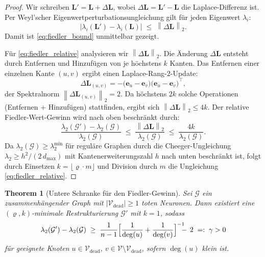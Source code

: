 ﻿\documentclass[12pt, a4paper, openany]{report}
\newtheorem{theorem}{Theorem}[chapter]
\newcommand{\calG}{\mathcal{G}}
\newcommand{\calV}{\mathcal{V}}
\newcommand{\norms}[1]{\left\|#1\right\|}
\newcommand{\abs}[1]{\left|#1\right|}
\begin{document}
\begin{proof}
Wir schreiben $\bm{L}' = \bm{L} + \Delta\bm{L}$, wobei $\Delta\bm{L} =
\bm{L}' - \bm{L}$ die Laplace-Differenz ist.  Per Weyl'scher
Eigenwertperturbationsungleichung gilt für jeden Eigenwert $\lambda_i$:
\begin{equation}
  \label{eq:weyl}
  \abs{\lambda_i(\bm{L}') - \lambda_i(\bm{L})} \;\leq\; \norms{\Delta\bm{L}}_2.
\end{equation}
Damit ist \eqref{eq:fiedler_bound} unmittelbar gezeigt.

Für \eqref{eq:fiedler_relative} analysieren wir $\norms{\Delta\bm{L}}_2$.
Die Änderung $\Delta\bm{L}$ entsteht durch Entfernen und Hinzufügen von
je höchstens $k$ Kanten.  Das Entfernen einer einzelnen Kante
$(u,v)$ ergibt einen Laplace-Rang-$2$-Update:
\[
  \Delta\bm{L}_{(u,v)}
  = -\bigl(\bm{e}_u - \bm{e}_v\bigr)\bigl(\bm{e}_u - \bm{e}_v\bigr)^\top,
\]
der Spektralnorm $\norms{\Delta\bm{L}_{(u,v)}}_2 = 2$.  Da höchstens
$2k$ solche Operationen (Entfernen + Hinzufügen) stattfinden, ergibt
sich $\norms{\Delta\bm{L}}_2 \leq 4k$.  Der relative Fiedler-Wert-Gewinn
wird nach oben beschränkt durch:
\[
  \frac{\lambda_2(\calG') - \lambda_2(\calG)}{\lambda_2(\calG)}
  \;\leq\;
  \frac{\norms{\Delta\bm{L}}_2}{\lambda_2(\calG)}
  \;\leq\;
  \frac{4k}{\lambda_2(\calG)}.
\]
Da $\lambda_2(\calG) \geq \lambda_2^{\min}$ für reguläre Graphen durch
die Cheeger-Ungleichung $\lambda_2 \geq h^2/(2\,d_{\max})$ mit
Kantenerweiterungszahl $h$ nach unten beschränkt ist, folgt durch
Einsetzen $k = \lfloor\varrho\cdot m\rfloor$ und Division durch $m$
die Ungleichung \eqref{eq:fiedler_relative}.
\end{proof}

\begin{theorem}[Untere Schranke für den Fiedler-Gewinn]
\label{thm:fiedler_lower}
Sei $\calG$ ein zusammenhängender Graph mit $|\calV_{\mathrm{dead}}| \geq 1$
toten Neuronen.  Dann existiert eine $(\varrho, k)$-minimale Restrukturierung
$\calG'$ mit $k = 1$, sodass
\begin{equation}
  \label{eq:fiedler_lower}
  \lambda_2(\calG') - \lambda_2(\calG)
  \;\geq\;
  \frac{1}{n-1}
  \Bigl[
    \frac{1}{\deg(u)} + \frac{1}{\deg(v)}
  \Bigr]^{-1} \!\!\!\!- \,2
  \;=:\; \gamma > 0
\end{equation}
für geeignete Knoten $u \in \calV_{\mathrm{dead}}$, $v \in \calV \setminus \calV_{\mathrm{dead}}$,
sofern $\deg(u)$ klein ist.
\end{theorem}
\end{document}
